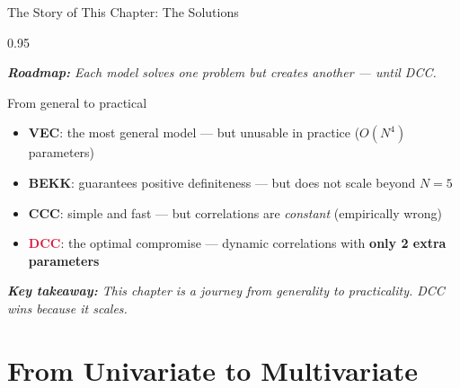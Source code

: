 \documentclass[9pt, aspectratio=169, t]{beamer}
\begin{document}
\begin{frame}{The Story of This Chapter: The Solutions}
    \begin{cminipage}{0.95\textwidth}
    {\footnotesize
    \textit{\textbf{Roadmap:} Each model solves one problem but creates another --- until DCC.}
    \vspace{0.2cm}
    \begin{block}{From general to practical}
        \begin{itemize}\setlength{\itemsep}{4pt}
            \item \textbf{VEC}: the most general model --- but unusable in practice ($O(N^4)$ parameters)
            \item \textbf{BEKK}: guarantees positive definiteness --- but does not scale beyond $N = 5$
            \item \textbf{CCC}: simple and fast --- but correlations are \textit{constant} (empirically wrong)
            \item \textcolor{Crimson}{\textbf{DCC}}: the optimal compromise --- dynamic correlations with \textbf{only 2 extra parameters}
        \end{itemize}
    \end{block}
    \vspace{0.2cm}
    \textit{\textbf{Key takeaway:} This chapter is a journey from generality to practicality. DCC wins because it scales.}
    }
    \end{cminipage}
\end{frame}

\section{From Univariate to Multivariate}
\end{document}
